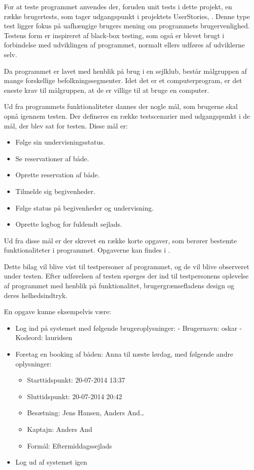 For at teste programmet anvendes der, foruden unit tests i dette projekt, en række brugertests, som tager udgangspunkt i projektets UserStories, .
Denne type test ligger fokus på uafhængige brugers mening om programmets brugervenlighed.
Testens form er inspireret af black-box testing, som også er blevet brugt i forbindelse med udviklingen af programmet, normalt ellers udføres af udviklerne selv.

Da programmet er lavet med henblik på brug i en sejlklub, består målgruppen af mange forskellige befolkningssegmenter. 
Idet det er et computerprogram, er det eneste krav til målgruppen, at de er villige til at bruge en computer.

Ud fra programmets funktionaliteter dannes der nogle mål, som brugerne skal opnå igennem testen. 
Der defineres en række testscenarier med udgangspunkt i de mål, der blev sat for testen.
Disse mål er:
\begin{itemize}
  \item Følge sin undervisningsstatus.
  \item Se reservationer af både.
  \item Oprette reservation af både.
  \item Tilmelde sig begivenheder.
  \item Følge status på begivenheder og undervisning.
  \item Oprette logbog for fuldendt sejlads.
\end{itemize}

Ud fra disse mål er der skrevet en række korte opgaver, som berører bestemte funktionaliteter i programmet. 
Opgaverne kan findes i .

Dette bilag vil blive vist til testpersoner af programmet, og de vil blive observeret under testen. 
Efter udførelsen af testen spørges der ind til testpersonens oplevelse af programmet med henblik på funktionalitet, brugergrænsefladens design og deres helhedsindtryk.

En opgave kunne eksempelvis være:
\begin{itemize}
	\item Log ind på systemet med følgende brugeroplysninger:
	\newline - Brugernavn: oskar
	\newline - Kodeord: lauridsen
	\item Foretag en booking af båden: Anna til næste lørdag, med følgende andre oplysninger: 
	\begin{itemize}
		\item Starttidspunkt: 20-07-2014 13:37
		\item Sluttidspunkt: 20-07-2014 20:42
		\item Besætning: Jens Hansen, Anders And\ldots
		\item Kaptajn: Anders And
		\item Formål: Eftermiddagssejlads
	\end{itemize}
	\item Log ud af systemet igen
\end{itemize}

